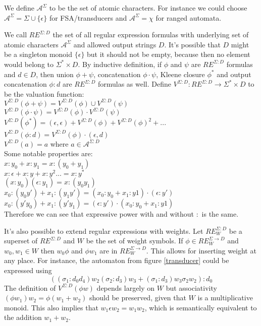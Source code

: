 \documentclass[journal]{journal}
\begin{document}
We define $\mathcal{A}^\Sigma$ to be the set of atomic characters. For instance we could choose $\mathcal{A}^\Sigma=\Sigma\cup\{\epsilon\}$ for FSA/transducers and $\mathcal{A}^\Sigma=\chi$ for ranged automata. 

We call  $RE^{\Sigma:D}$ the set of all regular expression formulas with underlying set of atomic characters $\mathcal{A}^\Sigma$ and allowed output strings $D$. It's possible that $D$ might be a singleton monoid $\{\epsilon \}$ but it should not be empty, because then no element would belong to $\Sigma^* \times D$. By inductive definition, if $\phi$ and $\psi$  are $RE^{ \Sigma:D}$  formulas and $d \in D$, then union $\phi + \psi$, concatenation $\phi \cdot \psi$, Kleene closure $\phi^*$ and output concatenation $\phi : d$ are $RE^{ \Sigma:D}$ formulas as well.  Define $V^{\Sigma:D}:RE^{\Sigma:D} \rightarrow \Sigma^* \times D$ to be the valuation function:  \\
$V^{\Sigma:D}(\phi + \psi) = V^{\Sigma:D}(\phi) \cup V^{\Sigma:D}(\psi)$ \\
$V^{\Sigma:D}(\phi \cdot \psi) = V^{\Sigma:D}(\phi) \cdot  V^{\Sigma:D}(\psi)$ \\
$V^{\Sigma:D}(\phi^*) = (\epsilon,\epsilon) + V^{\Sigma:D}(\phi) + V^{\Sigma:D}(\phi)^2 + ...$ \\
$V^{\Sigma:D}(\phi : d) = V^{\Sigma:D}(\phi)  \cdot (\epsilon,d)$ \\
$V^{\Sigma:D}(a) = a$ where $a\in\mathcal{A}^{\Sigma:D}$ \\
Some notable properties are: \\
$x:y_0 +x:y_1 = x:(y_0+y_1)$ \\
$x:\epsilon+x:y+x:y^2...=x:y^*$ \\
$(x:y_0)(\epsilon:y_1)  = x:(y_0y_1)$\\
$x_0:(y_0y')+x_1:(y_1y') = (x_0:y_0+x_1:y1)\cdot(\epsilon:y')$ \\
$x_0:(y'y_0)+x_1:(y'y_1) = (\epsilon:y')\cdot(x_0:y_0+x_1:y1)$  \\
Therefore we can see that expressive power with and without $:$ is the same. 

It's also possible to extend regular expressions with weights. Let $RE_W^{\Sigma: D}$ be a superset of $RE^{\Sigma: D}$ and $W$ be the set of weight symbols. If $\phi\in RE_W^{\Sigma\rightarrow D}$ and $w_0,w_1\in W$ then $w_0 \phi $ and  $\phi w_1 $ are in $RE_W^{\Sigma\rightarrow D}$. This allows for inserting weight at any place. For instance, the automaton from figure \ref{transducer} could be expressed using \[
((\sigma_1:d_0d_4)w_2(\sigma_2:d_3)w_3+
(\sigma_1:d_3)w_3\sigma_2w_2):d_0
\]
The definition of $V^{\Sigma:D}(\phi w)$ depends largely on $W$ but associativity $(\phi w_1) w_2 = \phi (w_1 + w_2)$ should be preserved, given that $W$ is a multiplicative monoid. This also implies that $w_1 \epsilon w_2 = w_1 w_2$, which is semantically equivalent to the addition $w_1 + w_2$. 
\end{document}
